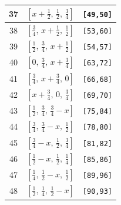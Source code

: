\documentclass[fleqn,8pt]{jsarticle}
\begin{document}
\begin{longtable}{ccc}
37 & $\left[ x + \frac{1}{2},\, \frac{1}{2},\, \frac{3}{4} \right]$ & {\tt [49,50]} \\ \hline
38 & $\left[ \frac{3}{4},\, x + \frac{1}{2},\, \frac{1}{2} \right]$ & {\tt [53,60]} \\ \hline
39 & $\left[ \frac{1}{2},\, \frac{3}{4},\, x + \frac{1}{2} \right]$ & {\tt [54,57]} \\ \hline
40 & $\left[ 0,\, \frac{3}{4},\, x + \frac{3}{4} \right]$ & {\tt [63,72]} \\ \hline
41 & $\left[ \frac{3}{4},\, x + \frac{3}{4},\, 0 \right]$ & {\tt [66,68]} \\ \hline
42 & $\left[ x + \frac{3}{4},\, 0,\, \frac{3}{4} \right]$ & {\tt [69,70]} \\ \hline
43 & $\left[ \frac{1}{2},\, \frac{3}{4},\, \frac{3}{4} - x \right]$ & {\tt [75,84]} \\ \hline
44 & $\left[ \frac{3}{4},\, \frac{3}{4} - x,\, \frac{1}{2} \right]$ & {\tt [78,80]} \\ \hline
45 & $\left[ \frac{3}{4} - x,\, \frac{1}{2},\, \frac{3}{4} \right]$ & {\tt [81,82]} \\ \hline
46 & $\left[ \frac{1}{2} - x,\, \frac{1}{2},\, \frac{1}{4} \right]$ & {\tt [85,86]} \\ \hline
47 & $\left[ \frac{1}{4},\, \frac{1}{2} - x,\, \frac{1}{2} \right]$ & {\tt [89,96]} \\ \hline
48 & $\left[ \frac{1}{2},\, \frac{1}{4},\, \frac{1}{2} - x \right]$ & {\tt [90,93]} \\
\end{longtable}
\renewcommand{\arraystretch}{1.2}
\end{document}
